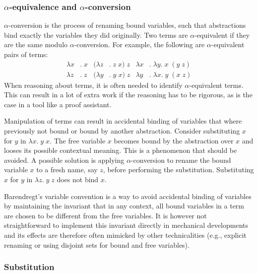 \documentclass[a4paper,11pt]{article}
\begin{document}
\subsubsection*{$\alpha$-equivalence and $\alpha$-conversion}

$\alpha$-conversion is the process of renaming bound variables, such
that abstractions bind exactly the variables they did originally.
Two terms are $\alpha$-equivalent if they are the same modulo
$\alpha$-conversion.
For example, the following are $\alpha$-equivalent pairs of terms:
\begin{align*}
  \lambda x&. \; x & (\lambda z&. \; z \; x) \; z & \lambda x&. \; \lambda y. \; x \; (y \; z)\\
  \lambda z&. \; z & (\lambda y&. \; y \; x) \; z & \lambda y&. \; \lambda x. \; y \; (x \; z)
\end{align*}
When reasoning about terms, it is often needed to identify $\alpha$-equivalent
terms.
This can result in a lot of extra work if the reasoning has to be rigorous,
as is the case in a tool like a proof assistant.

Manipulation of terms can result in accidental binding of variables that
where previously not bound or bound by another abstraction.
Consider substituting $x$ for $y$ in $\lambda x. \; y \; x$.
The free variable $x$ becomes bound by the abstraction over $x$ and looses
its possible contextual meaning.
This is a phenomenon that should be avoided.
A possible solution is applying $\alpha$-conversion to rename the bound
variable $x$ to a fresh name, say $z$, before performing the substitution.
Substituting $x$ for $y$ in $\lambda z. \; y \; z$ does not bind $x$.

Barendregt's variable convention is a way to avoid accidental binding of
variables by maintaining the invariant that in any context, all bound
variables in a term are chosen to be different from the free variables.
It is however not straightforward to implement this invariant directly in
mechanical developments and its effects are therefore often mimicked
by other technicalities (e.g., explicit renaming or using disjoint
sets for bound and free variables).

\subsubsection*{Substitution}
\end{document}

